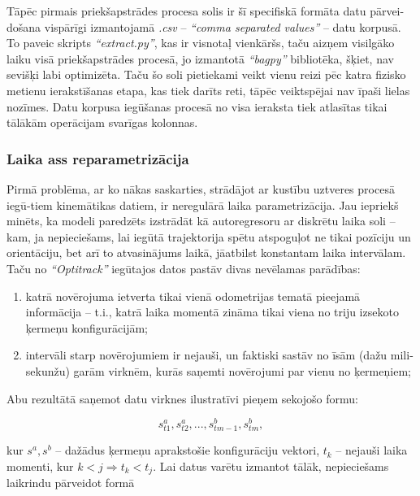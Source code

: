 \documentclass[12pt, a4paper]{article}
\numberwithin{equation}{section} %
\begin{document}
Tāpēc pirmais priekšapstrādes procesa solis ir šī specifiskā formāta datu pārvei-došana vispārīgi izmantojamā \textit{.csv} -- \textit{``comma separated values''} -- datu korpusā. To paveic skripts \textit{``extract.py''}, kas ir visnotaļ vienkāršs, taču aizņem visilgāko laiku visā priekšapstrādes procesā, jo izmantotā \textit{``bagpy''} bibliotēka, šķiet, nav sevišķi labi optimizēta. Taču šo soli pietiekami veikt vienu reizi pēc katra fizisko metienu ierakstīšanas etapa, kas tiek darīts reti, tāpēc veiktspējai nav īpaši lielas nozīmes. Datu korpusa iegūšanas procesā no visa ieraksta tiek atlasītas tikai tālākām operācijam svarīgas kolonnas.

\subsubsection{Laika ass reparametrizācija}

Pirmā problēma, ar ko nākas saskarties, strādājot ar kustību uztveres procesā iegū-tiem kinemātikas datiem, ir neregulārā laika parametrizācija. Jau iepriekš minēts, ka modeli paredzēts izstrādāt kā autoregresoru ar diskrētu laika soli -- kam, ja nepieciešams, lai iegūtā trajektorija spētu atspoguļot ne tikai pozīciju un orientāciju, bet arī to atvasinājums laikā, jāatbilst konstantam laika intervālam. Taču no \textit{``Optitrack''} iegūtajos datos pastāv divas nevēlamas parādības:

\begin{enumerate}
    \item katrā novērojuma ietverta tikai vienā odometrijas tematā pieejamā informācija -- t.i., katrā laika momentā zināma tikai viena no triju izsekoto ķermeņu konfigurācijām;
    \item intervāli starp novērojumiem ir nejauši, un faktiski sastāv no īsām (dažu mili-sekunžu) garām virknēm, kurās saņemti novērojumi par vienu no ķermeņiem;
\end{enumerate}

Abu rezultātā saņemot datu virknes ilustratīvi pieņem sekojošo formu:


\begin{equation}
    s^a_{t1}, s^a_{t2}, ..., s^b_{tm-1}, s^b_{tm},
\end{equation}

kur $s^a, s^b$ -- dažādus ķermeņu aprakstošie konfigurāciju vektori, $t_k$ -- nejauši laika momenti, kur $k < j \Rightarrow t_k < t_j$. Lai datus varētu izmantot tālāk, nepieciešams laikrindu pārveidot formā
\end{document}

